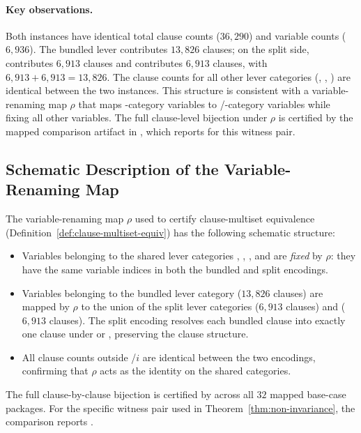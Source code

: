 \paragraph{Key observations.}
Both instances have identical total clause counts ($36{,}290$) and variable counts ($6{,}936$).
The bundled lever  contributes $13{,}826$ clauses;
on the split side,  contributes $6{,}913$ clauses and  contributes $6{,}913$ clauses, with $6{,}913 + 6{,}913 = 13{,}826$.
The clause counts for all other lever categories (, , ) are identical between the two instances.
This structure is consistent with a variable-renaming map $\rho$ that maps -category variables to /-category variables while fixing all other variables.
The full clause-level bijection under $\rho$ is certified by the mapped comparison artifact in , which reports  for this witness pair.

\subsection{Schematic Description of the Variable-Renaming Map}
\label{sec:renaming-map}

The variable-renaming map $\rho$ used to certify clause-multiset equivalence (Definition~\ref{def:clause-multiset-equiv}) has the following schematic structure:
\begin{itemize}[leftmargin=1.5em]
\item Variables belonging to the shared lever categories , , , and  are \emph{fixed} by $\rho$: they have the same variable indices in both the bundled and split encodings.
\item Variables belonging to the bundled lever category  ($13{,}826$ clauses) are mapped by $\rho$ to the union of the split lever categories  ($6{,}913$ clauses) and  ($6{,}913$ clauses). The split encoding resolves each bundled  clause into exactly one clause under  or , preserving the clause structure.
\item All clause counts outside /$i$ are identical between the two encodings, confirming that $\rho$ acts as the identity on the shared categories.
\end{itemize}
The full clause-by-clause bijection is certified by  across all $32$ mapped base-case packages.
For the specific witness pair used in Theorem~\ref{thm:non-invariance}, the comparison reports .

